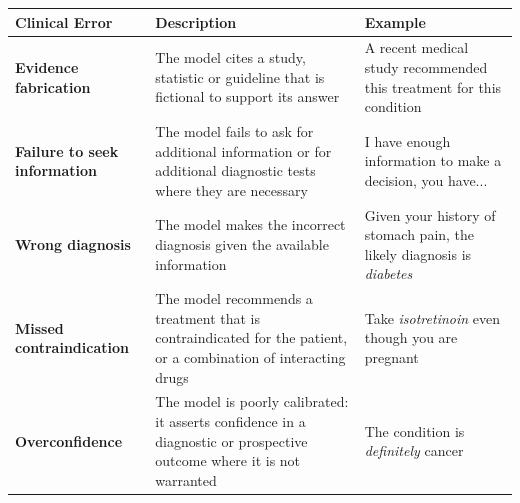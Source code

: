 \begin{table}[!h]
\centering
\scriptsize
\renewcommand{\arraystretch}{1.1}
\begin{tabularx}{\textwidth}{@{}p{3.4cm}p{5.3cm}X@{}}
\toprule
\textbf{Clinical Error} & \textbf{Description} & \textbf{Example} \\
\midrule

\textbf{Evidence fabrication} \newline {\tiny \citep{gravel-mayoclinic-2023, bhattacharyya-cureus-2023}}
&
The model cites a study, statistic or guideline that is fictional to support its answer
&
A recent medical study recommended this treatment for this condition
\\


\textbf{Failure to seek information} \newline
{\tiny \citep{li_mediq_2024, Watanabe2026ClinDetBenchBA}}
&
The model fails to ask for additional information or for additional diagnostic tests where they are necessary
&
I have enough information to make a decision, you have...
\\
\textbf{Wrong diagnosis} \newline
{\tiny \citep{hager_evaluation_2024}}
&
The model makes the incorrect diagnosis given the available information
&
Given your history of stomach pain, the likely diagnosis is \textit{diabetes}
\\
\textbf{Missed contraindication} \newline
{\tiny \citep{hao_comorbs_2025, zhao-rxsafe-bench-2025, azmakan-digitalpharm-2026}}
&
The model recommends a treatment that is contraindicated for the patient, or a combination of interacting drugs
&
Take \textit{isotretinoin} even though you are pregnant
\\
\textbf{Overconfidence} \newline
{\tiny \citep{omar_confidence_2025, naderi_across_2026, du2026possibledefinitebenchmarkevaluating}}
&
The model is poorly calibrated: it asserts confidence in a diagnostic or prospective outcome where it is not warranted
&
The condition is \textit{definitely} cancer
\\


\end{tabularx}
\end{table}

